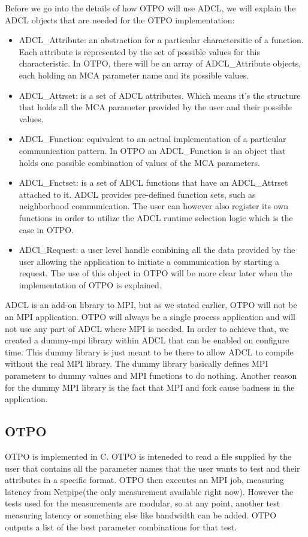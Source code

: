 Before we go into the details of how OTPO will use ADCL, we will explain the
ADCL objects that are needed for the OTPO implementation:
\begin{itemize}
\item ADCL\_Attribute\cite{ADCL-spec}: an abstraction for a particular
  charactersitic of a function. Each attribute is represented by the set of 
  possible values for this characteristic. In OTPO, there will be an array of
  ADCL\_Attribute objects, each holding an MCA parameter name and its possible
  values.
\item ADCL\_Attrset\cite{ADCL-spec}: is a set of ADCL attributes. Which means 
  it's the structure that holds all the MCA parameter provided by the user and 
  their possible values.
\item ADCL\_Function\cite{ADCL-spec}: equivalent to an actual implementation
  of a particular communication pattern. In OTPO an ADCL\_Function is an
  object that holds one possible combination of values of the MCA
  parameters.
\item ADCL\_Fnctset\cite{ADCL-spec}: is a set of ADCL functions that have an 
  ADCL\_Attrset attached to it. ADCL provides pre-defined function sets, such as
  neighborhood communication. The user can however also register its own functions 
  in order to utilize the ADCL runtime selection logic which is the case in OTPO.
\item ADCl\_Request\cite{ADCL-spec}: a user level handle combining all the data 
  provided by the user allowing the application to initiate a communication
  by starting a request. The use of this object in OTPO will be more clear later 
  when the implementation of OTPO is explained.
\end{itemize}

ADCL is an add-on library to MPI, but as we stated earlier, OTPO will not be an MPI
application. OTPO will always be a single process application and will not use
any part of ADCL where MPI is needed. In order to achieve that, we created a
dummy-mpi library within ADCL that can be enabled on configure time. This dummy
library is just meant to be there to allow ADCL to compile without the real
MPI library. The dummy library basically defines MPI parameters to dummy
values and MPI functions to do nothing. Another reason for the dummy MPI
library is the fact that MPI and fork cause badness in the application.

\subsection{OTPO}
OTPO is implemented in C. OTPO is inteneded to read a file supplied by the
user that contains all the parameter names that the user wants to test and
their attributes in a specific format. OTPO then executes an MPI job,
measuring latency from Netpipe\cite{netpipe}(the only measurement available
right now). However the tests used for the measurements are modular, so at any
point, another test measuring latency or something else like bandwidth can be
added. OTPO outputs a list of the best parameter combinations for that test.

